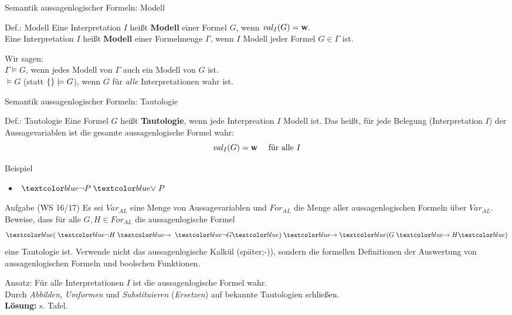 \begin{frame}{Semantik aussagenlogischer Formeln: Modell}
	\begin{block}{Def.: Modell}
		Eine Interpretation $I$ heißt \textbf{Modell} einer Formel $G$, wenn $\hbox{\textit{val}}_I(G)=\mathbf{w}$.\\[2ex]

		Eine Interpretation $I$ heißt \textbf{Modell} einer Formelmenge $\Gamma$, wenn $I$ Modell jeder Formel $G\in \Gamma$ ist.
	\end{block}

	\begin{exampleblock}{}
	Wir sagen:\\
	\textcolor{black!50!red}{$\Gamma \models G$}, wenn jedes Modell von $\Gamma$ auch ein Modell von $G$ ist.\\
	\textcolor{black!50!red}{$\models G$} (statt \textcolor{black!50!red}{$\{  \}\models G$}), wenn $G$ für \emph{alle} Interpretationen wahr ist.
	\end{exampleblock}
\end{frame}

\begin{frame}{Semantik aussagenlogischer Formeln: Tautologie}
	\begin{block}{Def.: Tautologie}
		Eine Formel $G$ heißt \textbf{Tautologie}, wenn jede Interpreation $I$ Modell ist. Das heißt, für jede Belegung (Interpretation $I$) der Aussagevariablen ist die gesamte aussagenlogische Formel wahr:
			\[	\hbox{\textit{val}}_I(G)=\mathbf{w} \quad \text{ für alle } I	\]
	\end{block}

	\begin{exampleblock}{Beispiel}
		\begin{itemize}
			\item \( \bnot{} P \boder P \)
		\end{itemize}
	\end{exampleblock}
\end{frame}


\begin{frame}{}
	\begin{exampleblock}{Aufgabe (WS 16/17)}
		Es sei \(Var_{AL}\) eine Menge von Aussagevariablen und \(For_{AL}\) die Menge aller aussagenlogischen Formeln über \(Var_{AL}\). Beweise, dass für alle \(G, H \in For_{AL}\) die aussagenlogische Formel
				\[	\bleftBr{} \bnot{} H\bimp{} \bnot{} G \brightBr{} \bimp{} \bleftBr{} G \bimp{} H \brightBr{}\]
		eine Tautologie ist. Verwende nicht das aussagenlogische Kalkül (später;-)), sondern die formellen Definitionen der Auswertung von aussagenlogischen Formeln und boolschen Funktionen.
	\end{exampleblock}
	\begin{block}{Ansatz:}
		\zz Für alle Interpretationen $I$ ist die aussagenlogische Formel wahr.\\[1ex]
		Durch \emph{Abbilden}, \emph{Umformen} und \emph{Substituieren} (\emph{Ersetzen}) auf bekannte Tautologien schließen.\\[1ex]
		\textbf{Lösung:} s. Tafel.
	\end{block}
\end{frame}

